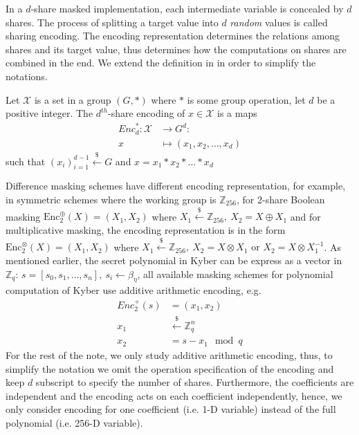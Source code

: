 \documentclass{llncs}
\begin{document}
In a $d$-share masked implementation, each intermediate variable is concealed by $d$ shares. The process of splitting a target value into $d$ \textit{random} values is called sharing encoding. The encoding representation determines the relations among shares and its target value, thus determines how the computations on shares are combined in the end. We extend the definition in \cite{Prouff13} in order to simplify the notations.
\begin{definition}
	Let $\mathcal{X}$ is a set in a group $(G, \ast)$ where $\ast$ is some group operation, let $d$ be a positive integer. The $d^{th}$-share encoding of $x \in \mathcal{X}$ is a maps
	\begin{align*} 
		{Enc}^{\ast}_d: \mathcal{X} &\rightarrow G^d:\\ 
		x &\mapsto (x_1, x_2, \dots, x_d)
	\end{align*}
such that $(x_i)_{i=1}^{d-1} \overset{\$}{\leftarrow} G$ and $x = x_1 \ast x_2 \ast \dots \ast x_d$	
\end{definition}
Difference masking schemes have different encoding representation, for example, in symmetric schemes where the working group is $\mathbb{Z}_{256}$, for 2-share Boolean masking $\text{Enc}^{\oplus}_{2}(X) = (X_1, X_2)$ where $X_1 \overset{\$}{\leftarrow} \mathbb{Z}_{256},\ X_2 = X \oplus X_1$ and for multiplicative masking, the encoding representation is in the form $\text{Enc}^{\otimes}_{2}(X) = (X_1, X_2)$ where $X_1 \overset{\$}{\leftarrow} \mathbb{Z}_{256},\ X_2 = X \otimes X_1 \text{ or } X_2 = X \otimes X_1^{-1}$.
As mentioned earlier, the secret polynomial in Kyber can be express as a vector in $\mathbb{Z}_q$:
$s = [s_0, s_1, \dots, s_n],\ s_i \leftarrow \beta_{\eta}$, all available masking schemes for polynomial computation of Kyber  use additive arithmetic encoding, e.g.
\begin{align*}
	Enc_2^{+}(s) &= (x_1, x_2)\\
	x_1 &\overset{\$}{\leftarrow} \mathbb{Z}_q^n\\
	x_2 &= s-x_1 \mod q
\end{align*}
For the rest of the note, we only study additive arithmetic encoding, thus, to simplify the notation we omit the operation specification of the encoding and keep $d$ subscript to specify the number of shares. Furthermore, the coefficients are independent  and the encoding acts on each coefficient independently, hence, we only consider encoding for one coefficient (i.e. 1-D variable) instead of the full polynomial (i.e. 256-D variable).
\end{document}
